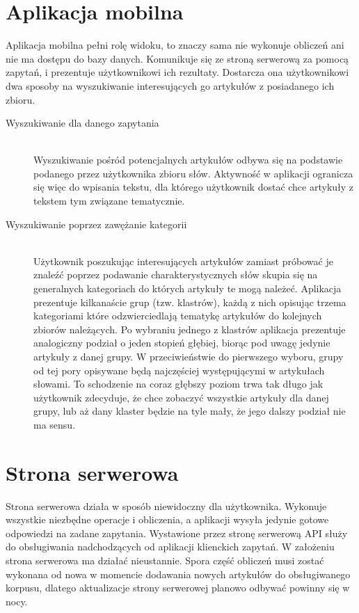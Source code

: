 \section{Aplikacja mobilna}
Aplikacja mobilna pełni rolę widoku, to znaczy sama nie wykonuje obliczeń ani nie ma dostępu do bazy danych. Komunikuje się ze stroną serwerową za pomocą zapytań, i prezentuje użytkownikowi ich rezultaty. Dostarcza ona użytkownikowi dwa sposoby na wyszukiwanie interesujących go artykułów z posiadanego ich zbioru.

\begin{description}
  \item[Wyszukiwanie dla danego zapytania] \hfill \\
  Wyszukiwanie pośród potencjalnych artykułów odbywa się na podstawie podanego przez użytkownika zbioru słów. Aktywność w aplikacji ogranicza się więc do wpisania tekstu, dla którego użytkownik dostać chce artykuły z tekstem tym związane tematycznie.
  \item[Wyszukiwanie poprzez zawężanie kategorii] \hfill \\
  Użytkownik poszukując interesujących artykułów zamiast próbować je znaleźć poprzez podawanie charakterystycznych słów skupia się na generalnych kategoriach do których artykuły te mogą należeć. Aplikacja prezentuje kilkanaście grup (tzw. klastrów), każdą z nich opisując trzema kategoriami które odzwierciedlają tematykę artykułów do kolejnych zbiorów należących. Po wybraniu jednego z klastrów aplikacja prezentuje analogiczny podział o jeden stopień głębiej, biorąc pod uwagę jedynie artykuły z danej grupy. W przeciwieństwie do pierwszego wyboru, grupy od tej pory opisywane będą najczęściej występującymi w artykułach słowami. To schodzenie na coraz głębszy poziom trwa tak długo jak użytkownik zdecyduje, że chce zobaczyć wszystkie artykuły dla danej grupy, lub aż dany klaster będzie na tyle mały, że jego dalszy podział nie ma sensu.

\end{description}

\section{Strona serwerowa}
Strona serwerowa działa w sposób niewidoczny dla użytkownika. Wykonuje wszystkie niezbędne operacje i obliczenia, a aplikacji wysyła jedynie gotowe odpowiedzi na zadane zapytania. Wystawione przez stronę serwerową API służy do obsługiwania nadchodzących od aplikacji klienckich zapytań. W założeniu strona serwerowa ma działać nieustannie. Spora część obliczeń musi zostać wykonana od nowa w momencie dodawania nowych artykułów do obsługiwanego korpusu, dlatego aktualizacje strony serwerowej planowo odbywać powinny się w nocy.

